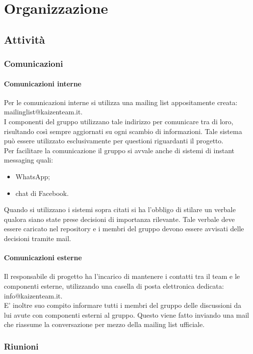 \section{Organizzazione}
	\subsection{Attività}
		\subsubsection{Comunicazioni}
			\paragraph{Comunicazioni interne}
				Per  le comunicazioni interne si utilizza una mailing list appositamente creata: mailinglist@kaizenteam.it.\\
				I componenti del gruppo utilizzano tale indirizzo per comunicare tra di loro, risultando così sempre aggiornati su ogni scambio di informazioni. Tale sistema può essere utilizzato esclusivamente per questioni riguardanti il progetto.\\
				Per facilitare la comunicazione il gruppo si avvale anche di sistemi di instant messaging quali:
				\begin{itemize}
					\item WhatsApp;
					\item chat di Facebook.
				\end{itemize}
				Quando si utilizzano i sistemi sopra citati si ha l'obbligo di stilare un verbale qualora siano state prese decisioni di importanza rilevante. Tale verbale deve essere caricato nel repository e i membri del gruppo devono essere avvisati delle decisioni tramite mail.
			\paragraph{Comunicazioni esterne}
				Il responsabile di progetto ha l’incarico di mantenere i contatti tra il team e le componenti esterne, utilizzando una casella di posta elettronica dedicata: info@kaizenteam.it.\\
				E' inoltre suo compito informare tutti i membri del gruppo delle discussioni da lui avute con componenti esterni al gruppo. Questo viene fatto inviando una mail che riassume la conversazione per mezzo della mailing list ufficiale.
		\subsubsection{Riunioni}
